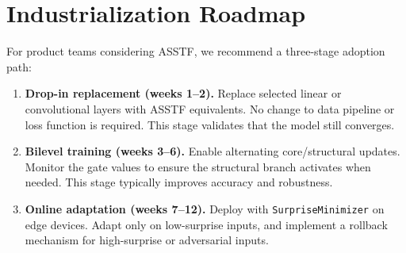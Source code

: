 \documentclass[11pt,a4paper]{article}
\theoremstyle{definition}
\begin{document}
\section{Industrialization Roadmap}
\label{sec:industrial}

For product teams considering ASSTF, we recommend a three-stage adoption path:

\begin{enumerate}
    \item \textbf{Drop-in replacement (weeks 1--2).} Replace selected linear or convolutional layers with ASSTF equivalents. No change to data pipeline or loss function is required. This stage validates that the model still converges.
    
    \item \textbf{Bilevel training (weeks 3--6).} Enable alternating core/structural updates. Monitor the gate values to ensure the structural branch activates when needed. This stage typically improves accuracy and robustness.
    
    \item \textbf{Online adaptation (weeks 7--12).} Deploy with \texttt{SurpriseMinimizer} on edge devices. Adapt only on low-surprise inputs, and implement a rollback mechanism for high-surprise or adversarial inputs.
\end{enumerate}

\begin{table}[t]
\centering
\small
\setlength{\tabcolsep}{3pt}
\caption{Industrial adoption checklist for ASSTF.}
\label{tab:checklist}
\end{table}
\end{document}
